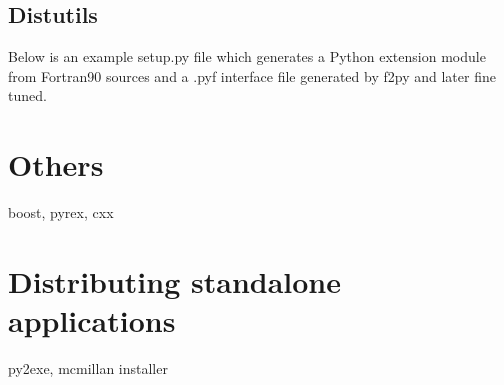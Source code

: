 \subsection{Distutils}

Below is an example setup.py file which generates a Python extension
module from Fortran90 sources and a .pyf interface file generated
by f2py and later fine tuned. 




\section{Others}

boost, pyrex, cxx


\section[Standalone applications]{Distributing standalone applications}

py2exe, mcmillan installer
